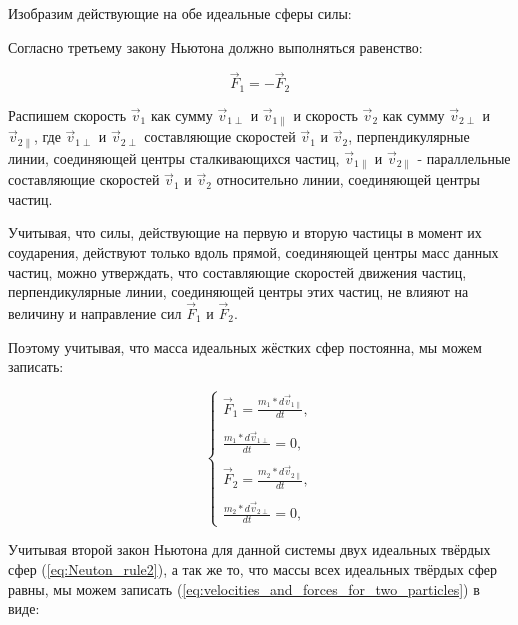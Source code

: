 \documentclass[a4paper]{article}
\begin{document}
Изобразим действующие на обе идеальные сферы силы:


Согласно третьему закону Ньютона должно выполняться равенство:

\begin{equation}\label{eq:Neuton_rule2}
        \vec{F}_1 = - \vec{F}_2
\end{equation}

Распишем скорость $ \vec{v}_1 $ как сумму $ \vec{v}_{1\perp} $ и $ \vec{v}_{1\parallel} $ и скорость $ \vec{v}_2 $ как сумму $ \vec{v}_{2\perp} $ и $ \vec{v}_{2\parallel} $, где $ \vec{v}_{1\perp} $ и $ \vec{v}_{2\perp} $ составляющие скоростей $ \vec{v}_1 $ и $ \vec{v}_2 $, перпендикулярные линии, соединяющей центры сталкивающихся частиц, $ \vec{v}_{1\parallel} $ и $ \vec{v}_{2\parallel} $ - параллельные составляющие скоростей $ \vec{v}_1 $ и $ \vec{v}_2 $ относительно линии, соединяющей центры частиц.

Учитывая, что силы, действующие на первую и вторую частицы в момент их соударения, действуют только вдоль прямой, соединяющей центры масс данных частиц, можно утверждать, что составляющие скоростей движения частиц, перпендикулярные линии, соединяющей центры этих частиц, не влияют на величину и направление сил $ \vec{F}_1 $ и $ \vec{F}_2 $.

Поэтому учитывая, что масса идеальных жёстких сфер постоянна, мы можем записать:

\begin{equation}\label{eq:velocities_and_forces_for_two_particles}
    \begin{cases}
        \vec{F}_1 = \displaystyle\frac{m_1*d\vec{v}_{1\parallel}}{dt},
        \\
        \\
        \displaystyle\frac{m_1*d\vec{v}_{1\perp}}{dt} = 0,
        \\
        \\
        \vec{F}_2 = \displaystyle\frac{m_2*d\vec{v}_{2\parallel}}{dt},
        \\
        \\
        \displaystyle\frac{m_2*d\vec{v}_{2\perp}}{dt} = 0,
    \end{cases}
\end{equation}

Учитывая второй закон Ньютона для данной системы двух идеальных твёрдых сфер (\ref{eq:Neuton_rule2}), а так же то, что массы всех идеальных твёрдых сфер равны, мы можем записать (\ref{eq:velocities_and_forces_for_two_particles}) в виде:
\end{document}
